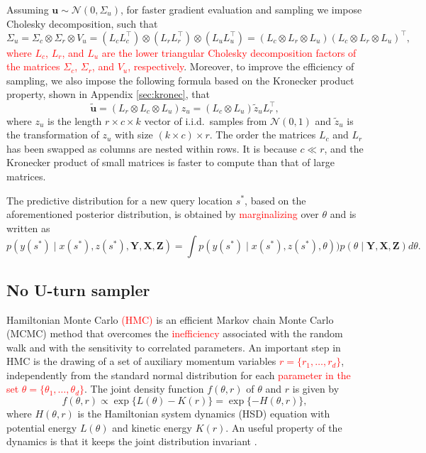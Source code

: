 \documentclass[a4paper]{article}   	%
\newcommand{\iid}{\textrm{i.i.d.\ }}
\newcommand{\N}{\mathcal{N}}
\begin{document}
	Assuming $\bm{u}\sim \N(0,\Sigma_u)$, for faster gradient evaluation and sampling we impose Cholesky decomposition, such that 
	\begin{equation}\label{eq:sigmau}
		\Sigma_u = \Sigma_c\otimes \Sigma_r\otimes V_u = (L_c L_c^\top)\otimes  (L_r L_r^\top)\otimes (L_u L_u^\top) = (L_c\otimes L_r\otimes L_u) (L_c\otimes L_r\otimes L_u)^\top, 
	\end{equation}
	\textcolor{red}{where $L_c$, $L_r$, and $L_u$ are the lower triangular Cholesky decomposition factors of the matrices $\Sigma_c$, $\Sigma_r$, and $V_u$, respectively}. 
	Moreover, to improve the efficiency of sampling, we also impose the following formula based on the Kronecker product property, shown in Appendix \ref{sec:kronec}, that 
	\begin{equation}
		\tilde{\bm{u}} = (L_r\otimes L_c\otimes L_u)z_u = (L_c\otimes L_u)\tilde{z}_u L_r^\top,
	\end{equation}
	where $z_u$ is the length $r\times c\times k$ vector of \iid samples from $\N(0,1)$ and  $\tilde{z}_u$ is the transformation of $z_u$ with size $(k\times c)\times r$. The order the matrices $L_c$ and $L_r$ has been swapped as columns are nested within rows. It is because $c\ll r$, and the Kronecker product of small matrices is faster to compute than that of large matrices. 
	
	The predictive distribution for a new query location $s^*$, based on the aforementioned posterior distribution, is obtained by \textcolor{red}{marginalizing} over $\theta$ and is written as 
	\begin{equation}\label{eq:prediction}
		p(y(s^*) \mid x(s^*), z(s^*), \bm{Y},\bm{X},\bm{Z}) = \int p(y(s^*) \mid x(s^*), z(s^*), \theta)) p(\theta\mid \bm{Y},\bm{X},\bm{Z}) d\theta. 
	\end{equation}
	
	
	\subsection{No U-turn sampler}
	
	Hamiltonian Monte Carlo \textcolor{red}{(HMC) \parencite{Brooks2011Handbook,duane1987hybrid}} is an efficient Markov chain Monte Carlo (MCMC) method that overcomes the \textcolor{red}{inefficiency} associated with the random walk and with the sensitivity to correlated parameters. An important step in HMC is the drawing of a set of auxiliary momentum variables \textcolor{red}{$r=\lbrace r_1,\ldots,r_d\rbrace$}, independently from the standard normal distribution for each \textcolor{red}{parameter in the set} \textcolor{red}{$\theta=\lbrace\theta_1,\ldots,\theta_d\rbrace$}.  The joint density function $f(\theta,r)$ of $\theta$ and $r$ is given by
	\begin{equation}
		f(\theta,r) \propto \exp \lbrace L(\theta)-K(r) \rbrace = \exp \lbrace -H(\theta,r) \rbrace,
	\end{equation}
	where $H(\theta,r)$ is the Hamiltonian system dynamics (HSD) equation with potential energy $L(\theta)$ and kinetic energy $K(r)$. An useful property of the dynamics is that it keeps the joint distribution invariant \parencite{Nishio2019Performance}. 
	
\end{document}
